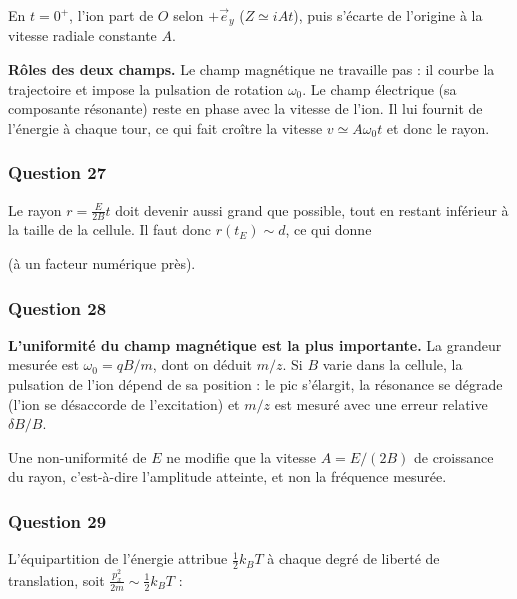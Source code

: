 \documentclass[11pt,a4paper]{article}
\newcommand{\equationajustee}[1]{%
  \sbox{\boiteequation}{$\displaystyle #1$}%
  \ifdim\wd\boiteequation>\linewidth
    \[\resizebox{\linewidth}{!}{\usebox{\boiteequation}}\]%
  \else
    \[#1\]%
  \fi}
\begin{document}
En \(t=0^+\), l'ion part de \(O\) selon \(+\vec e_y\) (\(Z\simeq iAt\)), puis s'écarte de l'origine à la vitesse radiale constante \(A\).

\textbf{Rôles des deux champs.} Le champ magnétique ne travaille pas : il courbe la trajectoire et impose la pulsation de rotation \(\omega_0\). Le champ électrique (sa composante résonante) reste en phase avec la vitesse de l'ion. Il lui fournit de l'énergie à chaque tour, ce qui fait croître la vitesse \(v\simeq A\omega_0t\) et donc le rayon.

\hypertarget{question-27}{%
\subsubsection{Question 27}\label{question-27}}

Le rayon \(r=\frac{E}{2B}t\) doit devenir aussi grand que possible, tout en restant inférieur à la taille de la cellule. Il faut donc \(r(t_E)\sim d\), ce qui donne

\equationajustee{\boxed{t_E\sim\frac{Bd}{E}}}

(à un facteur numérique près).

\hypertarget{question-28}{%
\subsubsection{Question 28}\label{question-28}}

\textbf{L'uniformité du champ magnétique est la plus importante.} La grandeur mesurée est \(\omega_0=qB/m\), dont on déduit \(m/z\). Si \(B\) varie dans la cellule, la pulsation de l'ion dépend de sa position : le pic s'élargit, la résonance se dégrade (l'ion se désaccorde de l'excitation) et \(m/z\) est mesuré avec une erreur relative \(\delta B/B\).

Une non-uniformité de \(E\) ne modifie que la vitesse \(A=E/(2B)\) de croissance du rayon, c'est-à-dire l'amplitude atteinte, et non la fréquence mesurée.

\hypertarget{question-29}{%
\subsubsection{Question 29}\label{question-29}}

L'équipartition de l'énergie attribue \(\frac12k_BT\) à chaque degré de liberté de translation, soit \(\frac{p_x^2}{2m}\sim\frac12k_BT\) :

\equationajustee{\boxed{p\sim\sqrt{m\,k_BT}}}
\end{document}
